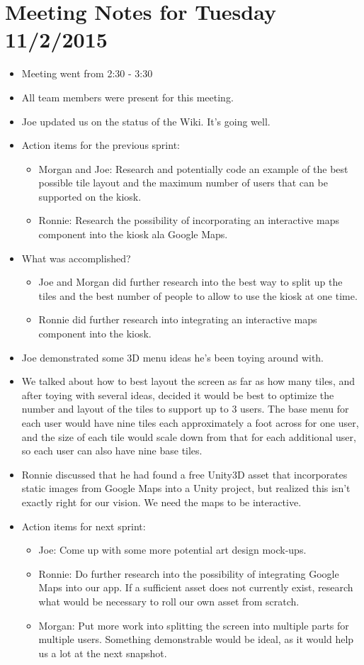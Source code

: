 \documentclass[]{article}
\begin{document}
\section{Meeting Notes for Tuesday 11/2/2015}
\begin{itemize}
	\item Meeting went from 2:30 - 3:30
	\item All team members were present for this meeting.
	\item Joe updated us on the status of the Wiki. It's going well.
	\item Action items for the previous sprint:
		\begin{itemize}
			\item Morgan and Joe: Research and potentially code an example of the best possible tile layout and the maximum number of users that can be supported on the kiosk.
			\item Ronnie: Research the possibility of incorporating an interactive maps component into the kiosk ala Google Maps.
		\end{itemize}
	\item What was accomplished?
		\begin{itemize}
			\item Joe and Morgan did further research into the best way to split up the tiles and the best number of people to allow to use the kiosk at one time.
			\item Ronnie did further research into integrating an interactive maps component into the kiosk.
		\end{itemize}
	\item Joe demonstrated some 3D menu ideas he's been toying around with. 
	\item We talked about how to best layout the screen as far as how many tiles, and after toying with several ideas, decided it would be best to optimize the number and layout of the tiles to support up to 3 users. The base menu for each user would have nine tiles each approximately a foot across for one user, and the size of each tile would scale down from that for each additional user, so each user can also have nine base tiles. 
	\item Ronnie discussed that he had found a free Unity3D asset that incorporates static images from Google Maps into a Unity project, but realized this isn't exactly right for our vision. We need the maps to be interactive. 
	\item Action items for next sprint:
		\begin{itemize}
			 \item Joe: Come up with some more potential art design mock-ups. 
			 \item Ronnie: Do further research into the possibility of integrating Google Maps into our app. If a sufficient asset does not currently exist, research what would be necessary to roll our own asset from scratch. 
			 \item Morgan: Put more work into splitting the screen into multiple parts for multiple users. Something demonstrable would be ideal, as it would help us a lot at the next snapshot.
		\end{itemize} 
\end{itemize}
	
\end{document}
